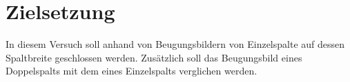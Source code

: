 \section{Zielsetzung}

\label{sec:Zielsetzung}

In diesem Versuch soll anhand von Beugungsbildern von Einzelspalte auf dessen Spaltbreite geschlossen werden. Zusätzlich soll
das Beugungsbild eines Doppelspalts mit dem eines Einzelspalts verglichen werden.
